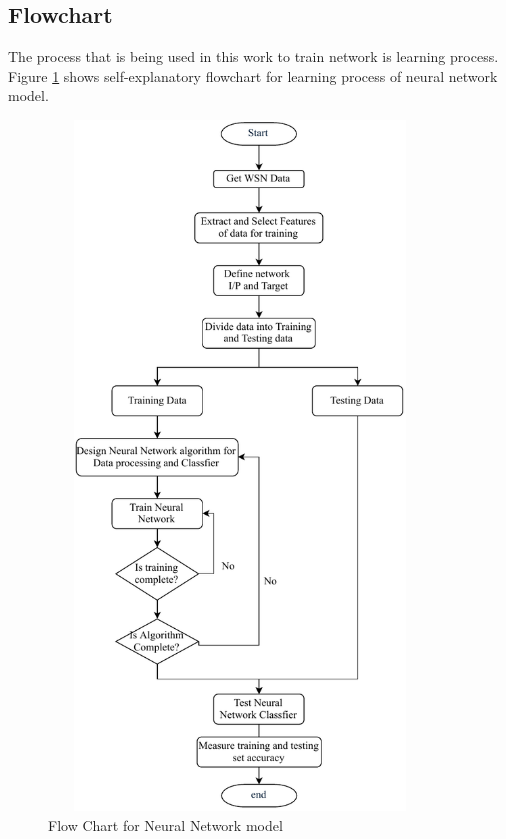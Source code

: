     \subsection{Flowchart}
    The process that is being used in this work to train network is learning process. Figure \ref{FlowChart} shows self-explanatory flowchart for learning process of neural network model.
        \begin{figure}[hbp]
        \center	
        \includegraphics[width=4in, height=7.2in] {Figures/PDF/FlowChart.pdf}
        \caption{Flow Chart for Neural Network model}
        \label{FlowChart}	
        \end{figure}

